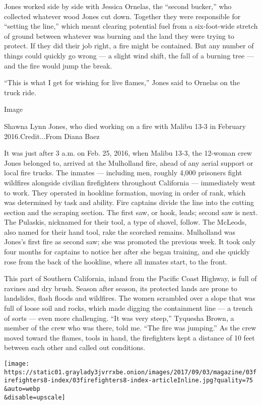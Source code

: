 Jones worked side by side with Jessica Ornelas, the ``second bucker,''
who collected whatever wood Jones cut down. Together they were
responsible for ``setting the line,'' which meant clearing potential
fuel from a six-foot-wide stretch of ground between whatever was burning
and the land they were trying to protect. If they did their job right, a
fire might be contained. But any number of things could quickly go wrong
--- a slight wind shift, the fall of a burning tree --- and the fire
would jump the break.

``This is what I get for wishing for live flames,'' Jones said to
Ornelas on the truck ride.

Image

Shawna Lynn Jones, who died working on a fire with Malibu 13-3 in
February 2016.Credit...From Diana Baez

It was just after 3 a.m. on Feb. 25, 2016, when Malibu 13-3, the
12-woman crew Jones belonged to, arrived at the Mulholland fire, ahead
of any aerial support or local fire trucks. The inmates --- including
men, roughly 4,000 prisoners fight wildfires alongside civilian
firefighters throughout California --- immediately went to work. They
operated in hookline formation, moving in order of rank, which was
determined by task and ability. Fire captains divide the line into the
cutting section and the scraping section. The first saw, or hook, leads;
second saw is next. The Pulaskis, nicknamed for their tool, a type of
shovel, follow. The McLeods, also named for their hand tool, rake the
scorched remains. Mulholland was Jones's first fire as second saw; she
was promoted the previous week. It took only four months for captains to
notice her after she began training, and she quickly rose from the back
of the hookline, where all inmates start, to the front.

This part of Southern California, inland from the Pacific Coast Highway,
is full of ravines and dry brush. Season after season, its protected
lands are prone to landslides, flash floods and wildfires. The women
scrambled over a slope that was full of loose soil and rocks, which made
digging the containment line --- a trench of sorts --- even more
challenging. ``It was very steep,'' Tyquesha Brown, a member of the crew
who was there, told me. ``The fire was jumping.'' As the crew moved
toward the flames, tools in hand, the firefighters kept a distance of 10
feet between each other and called out conditions.

\texttt{[image: https://static01.graylady3jvrrxbe.onion/images/2017/09/03/magazine/03firefighters8-index/03firefighters8-index-articleInline.jpg?quality=75\\\&auto=webp\\\&disable=upscale]}

